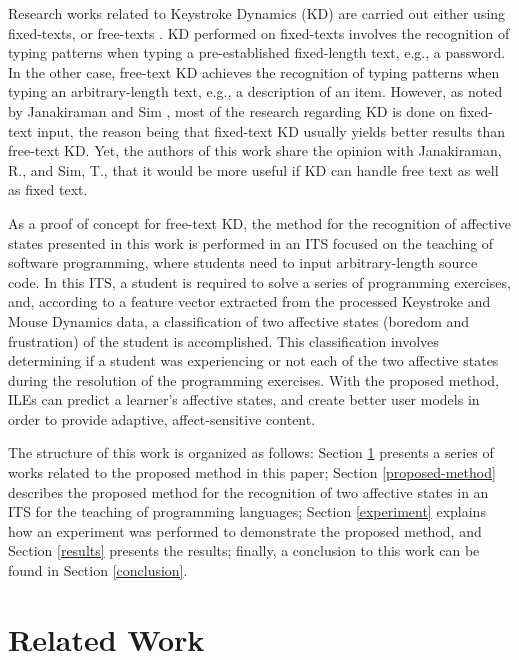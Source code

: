 \documentclass[runningheads,a4paper]{llncs}
\begin{document}
Research works related to Keystroke Dynamics (KD) are carried out either using fixed-texts, or free-texts \cite{free-text-fixed-text}. KD performed on fixed-texts involves the recognition of typing patterns when typing a pre-established fixed-length text, e.g., a password. In the other case, free-text KD achieves the recognition of typing patterns when typing an arbitrary-length text, e.g., a description of an item. However, as noted by Janakiraman and Sim \cite{fixed-is-better}, most of the research regarding KD is done on fixed-text input, the reason being that fixed-text KD usually yields better results than free-text KD. Yet, the authors of this work share the opinion with Janakiraman, R., and Sim, T., that it would be more useful if KD can handle free text as well as fixed text.

As a proof of concept for free-text KD, the method for the recognition of affective states presented in this work is performed in an ITS focused on the teaching of software programming, where students need to input arbitrary-length source code. In this ITS, a student is required to solve a series of programming exercises, and, according to a feature vector extracted from the processed Keystroke and Mouse Dynamics data, a classification of two affective states (boredom and frustration) of the student is accomplished. This classification involves determining if a student was experiencing or not each of the two affective states during the resolution of the programming exercises. With the proposed method, ILEs can predict a learner's affective states, and create better user models in order to provide adaptive, affect-sensitive content.

The structure of this work is organized as follows: Section \ref{related-work} presents a series of works related to the proposed method in this paper; Section \ref{proposed-method} describes the proposed method for the recognition of two affective states in an ITS for the teaching of programming languages; Section \ref{experiment} explains how an experiment was performed to demonstrate the proposed method, and Section \ref{results} presents the results; finally, a conclusion to this work can be found in Section \ref{conclusion}.



\section{Related Work}
\label{related-work}
\end{document}
